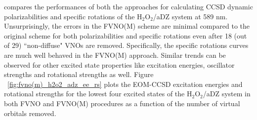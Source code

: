 compares the performances of both the approaches for calculating CCSD dynamic polarizabilities and specific rotations 
of the H$_2$O$_2$/aDZ system at 589 nm. Unsurprisingly, the errors in the FVNO(M) scheme are minimal compared to the original scheme for 
both polarizabilities and specific rotations even after 18 (out of 29) ``non-diffuse" VNOs are removed.
Specifically, the specific rotations curves are much well behaved in the 
FVNO(M) approach. Similar trends can be observed for other excited state
properties like excitation energies, oscillator strengths and rotational 
strengths as well. Figure ~\ref{fig:fvno(m)_h2o2_adz_ee_rs} plots the EOM-CCSD 
excitation energies and rotational strengths for the lowest four excited states of the H$_2$O$_2$/aDZ system
in both FVNO and FVNO(M) procedures as a function of the number of virtual orbitals removed.
